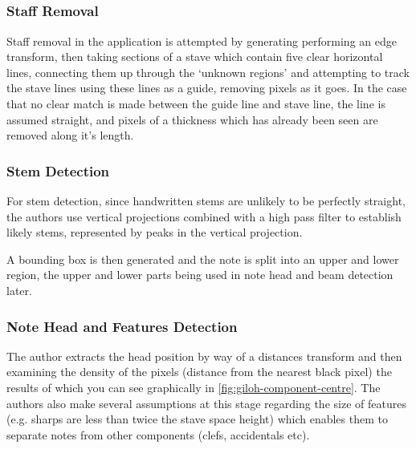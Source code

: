 \subsection{\cite{benoptical}}

\subsubsection{Staff Removal}

Staff removal in the application is attempted by generating performing an edge transform, then taking sections of a stave which contain five clear horizontal lines, connecting them up through the `unknown regions' and attempting to track the stave lines using these lines as a guide, removing pixels as it goes. In the case that no clear match is made between the guide line and stave line, the line is assumed straight, and pixels of a thickness which has already been seen are removed along it's length.

\subsubsection{Stem Detection}

For stem detection, since handwritten stems are unlikely to be perfectly straight, the authors use vertical projections combined with a high pass filter to establish likely stems, represented by peaks in the vertical projection.

A bounding box is then generated and the note is split into an upper and lower region, the upper and lower parts being used in note head and beam detection later.

\subsubsection{Note Head and Features Detection}

The author extracts the head position by way of a distances transform and then examining the density of the pixels (distance from the nearest black pixel) the results of which you can see graphically in \cref{fig:giloh-component-centre}. The authors also make several assumptions at this stage regarding the size of features (e.g. sharps are less than twice the stave space height) which enables them to separate notes from other components (clefs, accidentals etc).

